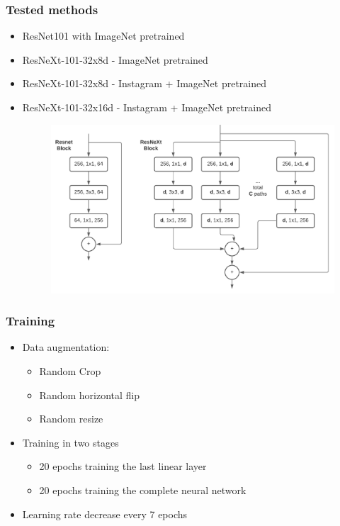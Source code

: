 \documentclass{beamer}
\begin{document}
\begin{frame}
	\frametitle{Tested methods}
	
	\begin{itemize}
		\item ResNet101 with ImageNet pretrained
		\item ResNeXt-101-32x8d - ImageNet pretrained
		\item ResNeXt-101-32x8d - Instagram  + ImageNet pretrained
		\item ResNeXt-101-32x16d - Instagram + ImageNet pretrained
		
		\begin{figure}[h]
			\begin{center}
				\includegraphics[width=1.0\linewidth]{resnet_resnext_block.pdf}
			\end{center}
			\label{fig:resnet}
			\end{figure}
		
		
	\end{itemize}
	
\end{frame}


\begin{frame}
	\frametitle{Training}
	
	\begin{itemize}
		\item Data augmentation: 
			\begin{itemize}
			\item Random Crop
			\item Random horizontal flip 
			\item Random resize
			\end{itemize}
		\item Training in two stages
		    \begin{itemize}
			\item 20 epochs training the last linear layer
			\item 20 epochs training the complete neural network
			\end{itemize}
		\item Learning rate decrease every 7 epochs
		
		
	\end{itemize}
	
\end{frame}
\end{document}
